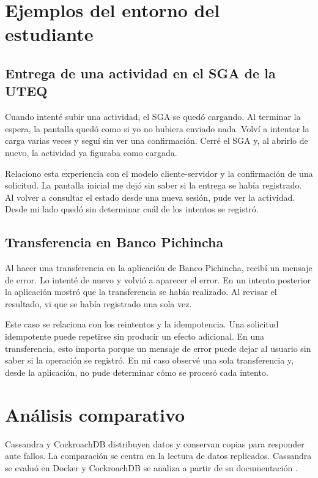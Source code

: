 \documentclass[12pt,a4paper]{article}
\begin{document}
\section{Ejemplos del entorno del estudiante}\subsection{Entrega de una actividad en el SGA de la UTEQ}
Cuando intenté subir una actividad, el SGA se quedó cargando. Al terminar la espera, la pantalla quedó como si yo no hubiera enviado nada. Volví a intentar la carga varias veces y seguí sin ver una confirmación. Cerré el SGA y, al abrirlo de nuevo, la actividad ya figuraba como cargada.

Relaciono esta experiencia con el modelo cliente-servidor y la confirmación de una solicitud. La pantalla inicial me dejó sin saber si la entrega se había registrado. Al volver a consultar el estado desde una nueva sesión, pude ver la actividad. Desde mi lado quedó sin determinar cuál de los intentos se registró.

\subsection{Transferencia en Banco Pichincha}
Al hacer una transferencia en la aplicación de Banco Pichincha, recibí un mensaje de error. Lo intenté de nuevo y volvió a aparecer el error. En un intento posterior la aplicación mostró que la transferencia se había realizado. Al revisar el resultado, vi que se había registrado una sola vez.

Este caso se relaciona con los reintentos y la idempotencia. Una solicitud idempotente puede repetirse sin producir un efecto adicional. En una transferencia, esto importa porque un mensaje de error puede dejar al usuario sin saber si la operación se registró. En mi caso observé una sola transferencia y, desde la aplicación, no pude determinar cómo se procesó cada intento.

\section{Análisis comparativo}
Cassandra y CockroachDB distribuyen datos y conservan copias para responder ante fallos. La comparación se centra en la lectura de datos replicados. Cassandra se evaluó en Docker y CockroachDB se analiza a partir de su documentación \cite{cassandraDynamo,cockroachRaft,cockroachReads}.
\end{document}
